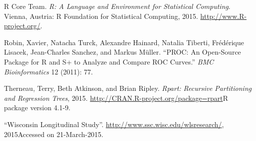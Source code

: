 \documentclass[11pt,]{article}
\begin{document}
R Core Team. \emph{R: A Language and Environment for Statistical
Computing}. Vienna, Austria: R Foundation for Statistical Computing,
2015. \url{http://www.R-project.org/}.

Robin, Xavier, Natacha Turck, Alexandre Hainard, Natalia Tiberti,
Frédérique Lisacek, Jean-Charles Sanchez, and Markus Müller. ``PROC: An
Open-Source Package for R and S+ to Analyze and Compare ROC Curves.''
\emph{BMC Bioinformatics} 12 (2011): 77.

Therneau, Terry, Beth Atkinson, and Brian Ripley. \emph{Rpart: Recursive
Partitioning and Regression Trees}, 2015.
\url{http://CRAN.R-project.org/package=rpart}R package version 4.1-9.

``Wisconsin Longitudinal Study''.
\url{http://www.ssc.wisc.edu/wlsresearch/}, 2015Accessed on
21-March-2015.
\end{document}

